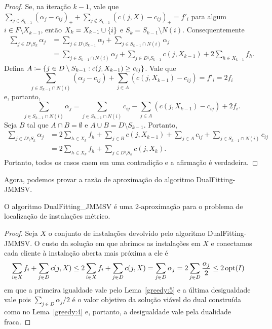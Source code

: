 \begin{proof}
Se, na iteração $k-1$, vale que $\sum_{j \in S_{k-1}} (\alpha_j - c_{ij})_+ + \sum_{j \not \in S_{k-1}}(c(j,X) - c_{ij})_+ = f'_i$ para algum $i \in F \setminus X_{k-1}$, então $X_k = X_{k-1} \cup \{i\}$ e $S_k = S_{k-1} \setminus N(i)$. Consequentemente 
\begin{align*}
\sum_{j \in D \setminus S_k} \alpha_j &= \sum_{j \in D\setminus S_{k-1}} \alpha_j + \sum_{j \in S_{k-1}\cap N(i)} \alpha_j \\
&= \sum_{j \in S_{k-1}\cap N(i)} \alpha_j +  \sum_{j \in D\setminus S_{k-1}}c(j,X_{k-1}) + 2 \sum_{h \in X_{k-1}} f_h.
\end{align*}
Defina $A\coloneqq \{j \in D\setminus S_{k-1}: c(j,X_{k-1}) \geq c_{ij}\}$. Vale que
\[ \sum_{j \in S_{k-1}\cap N(i)} (\alpha_j - c_{ij}) + \sum_{j \in A} (c(j,X_{k-1}) - c_{ij}) = f'_i = 2f_i \]
e, portanto,
\[ \sum_{j \in S_{k-1}\cap N(i)} \alpha_j = \sum_{j \in S_{k-1}\cap N(i)} c_{ij} - \sum_{j \in A} (c(j,X_{k-1}) - c_{ij}) + 2f_i. \]
Seja $B$ tal que $A \cap B = \emptyset$ e $A \cup B = D\setminus S_{k-1}$. Portanto,
\begin{subequations}
\begin{align*}
\sum_{j \in D \setminus S_k} \alpha_j &= 2\sum_{h \in X_k} f_h + \sum_{j \in B} c(j,X_{k-1}) + \sum_{j \in A} c_{ij} + \sum_{j \in S_{k-1} \cap N(i)} c_{ij}\\
&= 2 \sum_{h \in X_k} f_h + \sum_{j \in D \setminus S_k} c(j,X_k). 
\end{align*}
\end{subequations}
Portanto, todos os casos caem em uma contradição e a afirmação é verdadeira.
\end{proof}

Agora, podemos provar a razão de aproximação do algoritmo {\sc DualFitting-JMMSV}.

\begin{theorem}
O algoritmo {\sc DualFitting\_JMMSV} é uma 2-aproximação para o problema de localização de instalações métrico.
\end{theorem} 
\begin{proof}
Seja $X$ o conjunto de instalações devolvido pelo algoritmo {\sc DualFitting-JMMSV}. O custo da solução em que abrimos as instalações em $X$ e conectamos cada cliente à instalação aberta mais próxima a ele é
\begin{subequations}
\begin{align*}
\sum_{i \in X} f_i + \sum_{j \in D}c(j,X) &\leq 2\sum_{i \in X} f_i + \sum_{j \in D}c(j,X) = \sum_{j \in D} \alpha_j = 2\sum_{j \in D} \frac{\alpha_j}{2} \leq 2\, \mathrm{opt}(I)  
\end{align*}
\end{subequations}
em que a primeira igualdade vale pelo Lema~\ref{greedy:5} e a última desigualdade vale pois $\sum_{j \in D} \alpha_j/2 $ é o valor objetivo da solução viável do dual construída como no Lema~\ref{greedy:4} e, portanto, a desigualdade vale pela dualidade fraca.
\end{proof}


